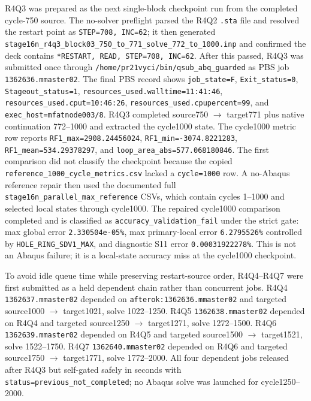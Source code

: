 \documentclass[11pt,a4paper]{article}
\newcommand{\code}[1]{\texttt{#1}}
\begin{document}
R4Q3 was prepared as the next single-block checkpoint run from the completed cycle-750 source. The no-solver preflight parsed the R4Q2 \code{.sta} file and resolved the restart point as \code{STEP=708, INC=62}; it then generated \code{stage16n\_r4q3\_block03\_750\_to\_771\_solve\_772\_to\_1000.inp} and confirmed the deck contains \code{*RESTART, READ, STEP=708, INC=62}. After this passed, R4Q3 was submitted once through \code{/home/pr21vyci/bin/qsub\_abq\_guarded} as PBS job \code{1362636.mmaster02}. The final PBS record shows \code{job\_state=F}, \code{Exit\_status=0}, \code{Stageout\_status=1}, \code{resources\_used.walltime=11:41:46}, \code{resources\_used.cput=10:46:26}, \code{resources\_used.cpupercent=99}, and \code{exec\_host=mfatnode003/8}. R4Q3 completed source750 \(\rightarrow\) target771 plus native continuation 772--1000 and extracted the cycle1000 state. The cycle1000 metric row reports \code{RF1\_max=2908.24456024}, \code{RF1\_min=-3074.8221283}, \code{RF1\_mean=534.29378297}, and \code{loop\_area\_abs=577.068180846}. The first comparison did not classify the checkpoint because the copied \code{reference\_1000\_cycle\_metrics.csv} lacked a \code{cycle=1000} row. A no-Abaqus reference repair then used the documented full \code{stage16n\_parallel\_max\_reference} CSVs, which contain cycles 1--1000 and selected local states through cycle1000. The repaired cycle1000 comparison completed and is classified as \code{accuracy\_validation\_fail} under the strict gate: max global error \code{2.330504e-05\%}, max primary-local error \code{6.2795526\%} controlled by \code{HOLE\_RING\_SDV1\_MAX}, and diagnostic S11 error \code{0.00031922278\%}. This is not an Abaqus failure; it is a local-state accuracy miss at the cycle1000 checkpoint.

To avoid idle queue time while preserving restart-source order, R4Q4--R4Q7 were first submitted as a held dependent chain rather than concurrent jobs. R4Q4 \code{1362637.mmaster02} depended on \code{afterok:1362636.mmaster02} and targeted source1000 \(\rightarrow\) target1021, solve 1022--1250. R4Q5 \code{1362638.mmaster02} depended on R4Q4 and targeted source1250 \(\rightarrow\) target1271, solve 1272--1500. R4Q6 \code{1362639.mmaster02} depended on R4Q5 and targeted source1500 \(\rightarrow\) target1521, solve 1522--1750. R4Q7 \code{1362640.mmaster02} depended on R4Q6 and targeted source1750 \(\rightarrow\) target1771, solve 1772--2000. All four dependent jobs released after R4Q3 but self-gated safely in seconds with \code{status=previous\_not\_completed}; no Abaqus solve was launched for cycle1250--2000.
\end{document}
